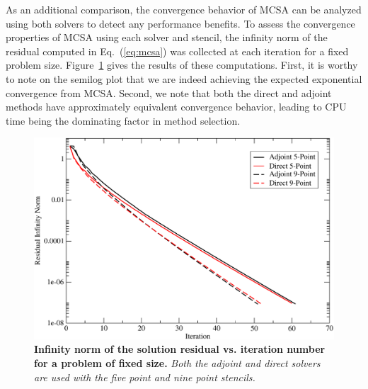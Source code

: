 As an additional comparison, the convergence behavior of MCSA can be
analyzed using both solvers to detect any performance benefits. To
assess the convergence properties of MCSA using each solver and
stencil, the infinity norm of the residual computed in
Eq.~(\ref{eq:mcsa}) was collected at each iteration for a fixed
problem size. Figure~\ref{fig:poisson_convergence} gives the results
of these computations. First, it is worthy to note on the semilog plot
that we are indeed achieving the expected exponential convergence from
MCSA. Second, we note that both the direct and adjoint methods have
approximately equivalent convergence behavior, leading to CPU time
being the dominating factor in method selection.
\begin{figure}[h!]
  \centering
  \includegraphics[width=5in,clip]{chapters/research_proposal/Adjoint_Direct_Convergence.pdf}
  \caption{\textbf{Infinity norm of the solution residual
      vs. iteration number for a problem of fixed size.} \textit{Both
      the adjoint and direct solvers are used with the five point and
      nine point stencils.}}
  \label{fig:poisson_convergence}
\end{figure}

